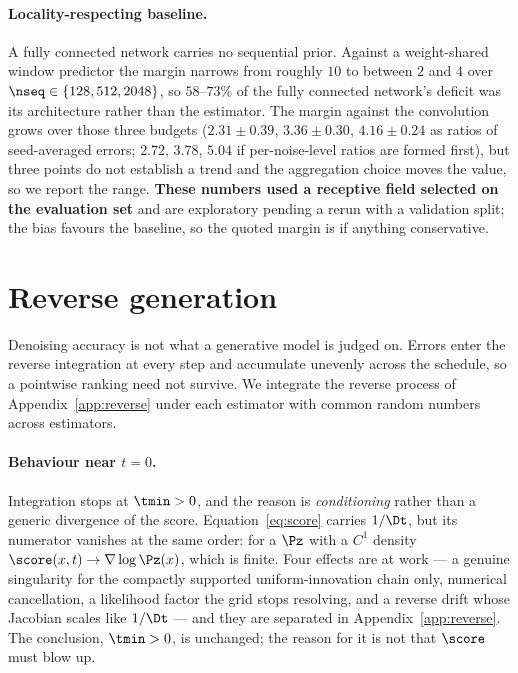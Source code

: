 \documentclass{article}
\begin{document}
\paragraph{Locality-respecting baseline.} A fully connected network carries no sequential prior.
Against a weight-shared window predictor the margin narrows from roughly $10$ to between $2$ and
$4$ over $\nseq\in\{128,512,2048\}$, so $58$--$73\%$ of the fully connected network's deficit
was its architecture rather than the estimator. The margin against the convolution grows over
those three budgets ($2.31\pm0.39$, $3.36\pm0.30$, $4.16\pm0.24$ as ratios of seed-averaged
errors; $2.72$, $3.78$, $5.04$ if per-noise-level ratios are formed first), but three points do
not establish a trend and the aggregation choice moves the value, so we report the range.
\textbf{These numbers used a receptive field selected on the evaluation set} and are exploratory
pending a rerun with a validation split; the bias favours the baseline, so the quoted margin is
if anything conservative.

\section{Reverse generation}
\label{sec:generation}

Denoising accuracy is not what a generative model is judged on. Errors enter the reverse
integration at every step and accumulate unevenly across the schedule, so a pointwise ranking
need not survive. We integrate the reverse process of Appendix~\ref{app:reverse} under each
estimator with common random numbers across estimators.

\paragraph{Behaviour near $t=0$.} Integration stops at $\tmin>0$, and the reason is
\emph{conditioning} rather than a generic divergence of the score. Equation~\eqref{eq:score}
carries $1/\Dt$, but its numerator vanishes at the same order: for a $\Pz$ with a $C^1$ density
$\score(x,t)\to\nabla\log\Pz(x)$, which is finite. Four effects are at work --- a genuine
singularity for the compactly supported uniform-innovation chain only, numerical cancellation,
a likelihood factor the grid stops resolving, and a reverse drift whose Jacobian scales like
$1/\Dt$ --- and they are separated in Appendix~\ref{app:reverse}. The conclusion, $\tmin>0$, is
unchanged; the reason for it is not that $\score$ must blow up.
\end{document}
